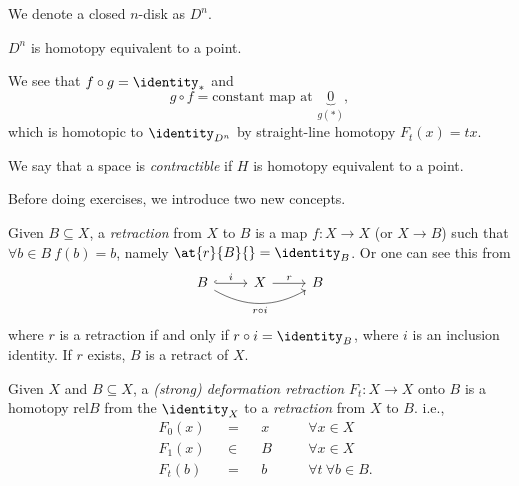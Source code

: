\begin{notation}
	We denote a closed \(n\)-disk as \(D^n\).
\end{notation}
\begin{eg}
	\(D^n\) is homotopy equivalent to a point.
	\begin{figure}[H]
		\centering
		\label{fig:eg:closed-disk-eq-point}
	\end{figure}

	We see that \(f\circ g = \identity_*\) and
	\[
		g\circ f = \text{constant map at }\underbrace{0}_{g(*)},
	\]
	which is homotopic to \(\identity_{D^n}\) by straight-line homotopy \(F_t(x) = tx\).
\end{eg}

\begin{note}
	We say that a space is \emph{contractible} if \(H\) is homotopy equivalent to a point.
\end{note}

Before doing exercises, we introduce two new concepts.
\begin{definition}[Retraction]
	Given \(B\subseteq X\), a \emph{retraction} from \(X\) to \(B\) is a map \(f\colon X\to X\) (or \(X\to B\))
	such that \(\forall b\in B\ f(b) = b\), namely \(\at{r}{B}{} = \identity_B\). Or one can see this from
	\[
		\begin{tikzcd}
			B \ar[rr, swap, bend right=30, "r \circ i"] \ar[r,hook,"i"] & X \ar[r, "r"] & B
		\end{tikzcd}
	\]
	where \(r\) is a retraction if and only if \(r\circ i = \identity_B\), where \(i\) is an inclusion identity.
	If \(r\) exists, \(B\) is a retract of \(X\).
\end{definition}
\begin{definition}
	Given \(X\) and \(B\subseteq X\), a \emph{(strong) deformation retraction} \(F_t\colon X\to X\) onto \(B\) is
	a homotopy \(\mathrm{rel} B\) from the \(\identity_X\) to a \emph{retraction} from \(X\) to \(B\). i.e.,
	\[
		\begin{alignedat}{4}
			&F_0(x) &&= &&x\quad &&\forall x\in X\\
			&F_1(x) &&\in &&B\quad &&\forall x\in X\\
			&F_t(b) &&= &&b\quad &&\forall t\ \forall b\in B.
		\end{alignedat}
	\]
\end{definition}

